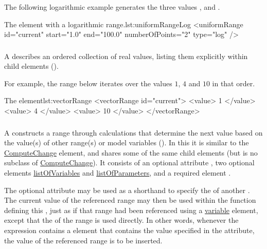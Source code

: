 The following logarithmic example generates the three values ,  and .
\begin{myXmlLst}{The  element with a logarithmic range.}{lst:uniformRangeLog}
<uniformRange id="current" start="1.0" end="100.0" numberOfPoints="2" type="log" />
\end{myXmlLst}

\subsubsection{}
\label{class:vectorRange}

A  describes an ordered collection of real values, listing them explicitly within child  elements ().

For example, the range below iterates over the values $1$, $4$ and $10$ in that order.
\begin{myXmlLst}{The  element}{lst:vectorRange}
<vectorRange id="current"> 
	<value> 1 </value> 
	<value> 4 </value> 
	<value> 10 </value> 
</vectorRange> 
\end{myXmlLst}

\subsubsection{}
\label{class:functionalRange}
A  constructs a range through calculations that determine the next value based on the value(s) of other range(s) or model variables (). In this it is similar to the \hyperref[class:computeChange]{ComputeChange} element, and shares some of the same child elements (but is no subclass of \hyperref[class:computeChange]{ComputeChange}). It consists of an optional attribute , two optional elements \hyperref[sec:listOfVariables]{listOfVariables} and \hyperref[sec:listOfParameters]{listOfParameters}, and a required element .

The optional attribute  may be used as a shorthand to specify the  of another . The current value of the referenced range may then be used within the function defining this , just as if that range had been referenced using a \hyperref[class:variable]{variable} element, except that the  of the range is used directly. In other words, whenever the expression contains a  element that contains the value specified in the  attribute, the value of the referenced range is to be inserted.

